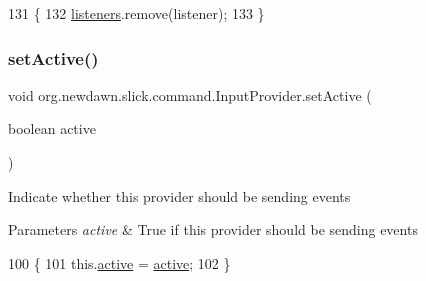 \begin{DoxyCode}
131                                                                \{
132         \mbox{\hyperlink{classorg_1_1newdawn_1_1slick_1_1command_1_1_input_provider_a007146935ecc6c0f69ff3d7958042867}{listeners}}.remove(listener);
133     \}
\end{DoxyCode}
\mbox{\label{classorg_1_1newdawn_1_1slick_1_1command_1_1_input_provider_a4ff61ae89a9b3fc0ac8bcf95adc38a01}} 
\subsubsection{\texorpdfstring{set\+Active()}{setActive()}}
{\footnotesize\ttfamily void org.\+newdawn.\+slick.\+command.\+Input\+Provider.\+set\+Active (\begin{DoxyParamCaption}\item[{boolean}]{active }\end{DoxyParamCaption})\hspace{0.3cm}{\ttfamily [inline]}}

Indicate whether this provider should be sending events


\begin{DoxyParams}{Parameters}
{\em active} & True if this provider should be sending events \\
\hline
\end{DoxyParams}

\begin{DoxyCode}
100                                           \{
101         this.\mbox{\hyperlink{classorg_1_1newdawn_1_1slick_1_1command_1_1_input_provider_ad390b811fb89db3fde054cc1ecae20b0}{active}} = \mbox{\hyperlink{classorg_1_1newdawn_1_1slick_1_1command_1_1_input_provider_ad390b811fb89db3fde054cc1ecae20b0}{active}};
102     \}
\end{DoxyCode}
\mbox{\label{classorg_1_1newdawn_1_1slick_1_1command_1_1_input_provider_a4c5a3cae6a8b19d53b8a3419d856d449}} 
